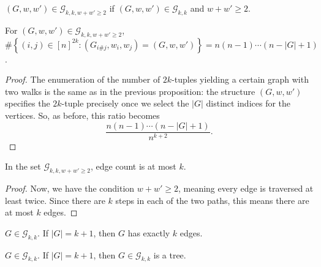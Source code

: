 \begin{definition}
  \notready
  \label{def:graph_walk_triple_set_w_ge_two}
  $(G,w,w')\in \mathcal{G}_{k,k,w+w'\ge 2}$ if $(G,w,w') \in \mathcal{G}_{k,k}$ and $w + w' \ge 2$.
\end{definition}


\begin{proposition}
  \label{lem:g_w_w_count}
  \notready
  For $(G, w, w') \in \mathcal{G}_{k,k,w+w'\ge 2}$, $\#\left\{(i,{j})\in [n]^{2k}\colon (G_{i\#j},w_{i},w_{j}) = (G,w,w')\right\} = n(n-1)\cdots (n-|G|+1)$.
\end{proposition}

\begin{proof}
  \notready
  The enumeration of the number of $2k$-tuples yielding a certain graph with two walks is the same as in the previous proposition: the structure $(G,w,w')$ specifies the $2k$-tuple precisely once we select the $|G|$ distinct indices for the vertices.  So, as before, this ratio becomes \[ \frac{n(n-1)\cdots (n-|G|+1)}{n^{k+2}}. \]
\end{proof}


\begin{lemma}
  \label{lem:g_k_k_edge_count_maximum}
  \notready

  In the set $\mathcal{G}_{k,k,w+w'\ge 2}$, edge count is at most $k$.
\end{lemma}

\begin{proof}
  \notready
  Now, we have the condition $w+w'\ge 2$, meaning every edge is traversed at least twice.  Since there are $k$ steps in each of the two paths, this means there are at most $k$ edges.
\end{proof}


\begin{lemma}
  \label{lem:exactly_k_edges}
  \notready
  $G \in \mathcal{G}_{k, k}$. If $|G| = k + 1$, then $G$ has exactly $k$ edges.
\end{lemma}


\begin{lemma}
  \label{lem:G_is_tree}
  \notready
  $G \in \mathcal{G}_{k, k}$. If $|G| = k + 1$, then $G \in \mathcal{G}_{k, k}$ is a tree.
\end{lemma}


